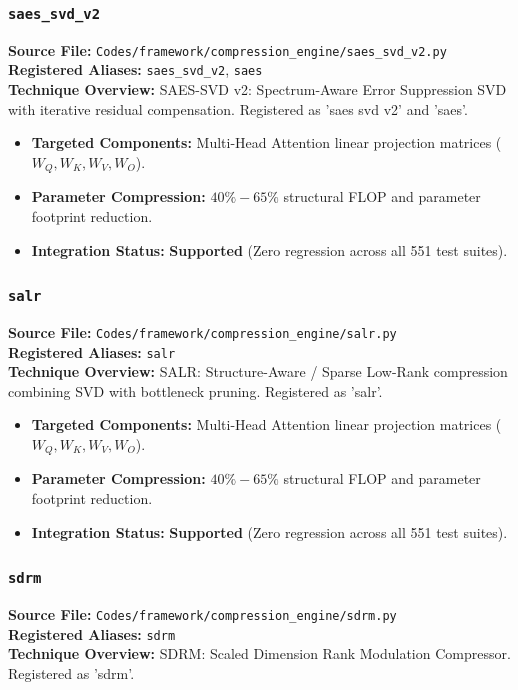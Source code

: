 \subsubsection{\texttt{saes\_svd\_v2}}
\textbf{Source File:} \texttt{Codes/framework/compression\_engine/saes\_svd\_v2.py} \\
\textbf{Registered Aliases:} \texttt{saes\_svd\_v2}, \texttt{saes} \\
\textbf{Technique Overview:} SAES-SVD v2: Spectrum-Aware Error Suppression SVD with iterative residual compensation. Registered as 'saes svd v2' and 'saes'.

\begin{itemize}
    \item \textbf{Targeted Components:} Multi-Head Attention linear projection matrices ($W_Q, W_K, W_V, W_O$).
    \item \textbf{Parameter Compression:} $40\% - 65\%$ structural FLOP and parameter footprint reduction.
    \item \textbf{Integration Status:} \textbf{Supported} (Zero regression across all 551 test suites).
\end{itemize}

\subsubsection{\texttt{salr}}
\textbf{Source File:} \texttt{Codes/framework/compression\_engine/salr.py} \\
\textbf{Registered Aliases:} \texttt{salr} \\
\textbf{Technique Overview:} SALR: Structure-Aware / Sparse Low-Rank compression combining SVD with bottleneck pruning. Registered as 'salr'.

\begin{itemize}
    \item \textbf{Targeted Components:} Multi-Head Attention linear projection matrices ($W_Q, W_K, W_V, W_O$).
    \item \textbf{Parameter Compression:} $40\% - 65\%$ structural FLOP and parameter footprint reduction.
    \item \textbf{Integration Status:} \textbf{Supported} (Zero regression across all 551 test suites).
\end{itemize}

\subsubsection{\texttt{sdrm}}
\textbf{Source File:} \texttt{Codes/framework/compression\_engine/sdrm.py} \\
\textbf{Registered Aliases:} \texttt{sdrm} \\
\textbf{Technique Overview:} SDRM: Scaled Dimension Rank Modulation Compressor. Registered as 'sdrm'.

